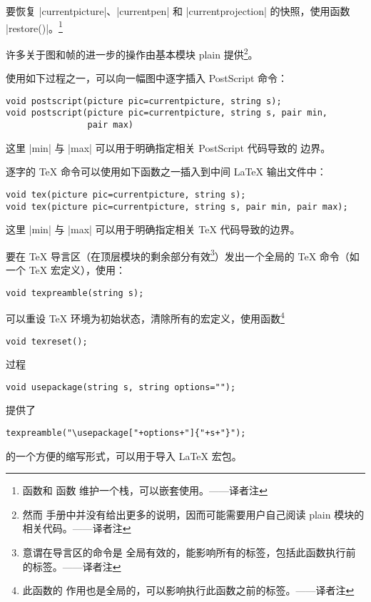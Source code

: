 \documentclass{ctexbook}
\makeatletter
\newenvironment{typelist}{\itemize
  \let\old@item\@item
  \def\@item[##1]{\expandafter\old@item[\ttfamily\color{type!50!black}##1]}}
{\enditemize}
\newcommand*\prgname[1]{\textsf{#1}}
\newcommand\transnote[1]{\footnote{#1——译者注}}
\makeatother
\begin{document}
\begin{typelist}
要恢复 |currentpicture|、|currentpen| 和 |currentprojection| 的快照，使用函数
|restore()|。\transnote{ 函数和  函数
维护一个栈，可以嵌套使用。}

许多关于图和帧的进一步的操作由基本模块 \prgname{plain} 提供\transnote{然而
手册中并没有给出更多的说明，因而可能需要用户自己阅读 \prgname{plain} 模块的
相关代码。}。

使用如下过程之一，可以向一幅图中逐字插入 \prgname{PostScript} 命令：
\begin{lstlisting}
void postscript(picture pic=currentpicture, string s);
void postscript(picture pic=currentpicture, string s, pair min,
                pair max)
\end{lstlisting}
这里 |min| 与 |max| 可以用于明确指定相关 \prgname{PostScript} 代码导致的
边界。

逐字的 \TeX{} 命令可以使用如下函数之一插入到中间 \LaTeX{} 输出文件中：
\begin{lstlisting}
void tex(picture pic=currentpicture, string s);
void tex(picture pic=currentpicture, string s, pair min, pair max);
\end{lstlisting}
这里 |min| 与 |max| 可以用于明确指定相关 \TeX{} 代码导致的边界。

要在 \TeX{} 导言区（在顶层模块的剩余部分有效\transnote{意谓在导言区的命令是
全局有效的，能影响所有的标签，包括此函数执行前的标签。}）发出一个全局的
\TeX{} 命令（如一个 \TeX{} 宏定义），使用：
\begin{lstlisting}
void texpreamble(string s);
\end{lstlisting}

可以重设 \TeX{} 环境为初始状态，清除所有的宏定义，使用函数\transnote{此函数的
作用也是全局的，可以影响执行此函数之前的标签。}
\begin{lstlisting}
void texreset();
\end{lstlisting}

过程
\begin{lstlisting}
void usepackage(string s, string options="");
\end{lstlisting}
提供了
\begin{lstlisting}
texpreamble("\usepackage["+options+"]{"+s+"}");
\end{lstlisting}
的一个方便的缩写形式，可以用于导入 \LaTeX{} 宏包。

\end{typelist}
\end{document}
